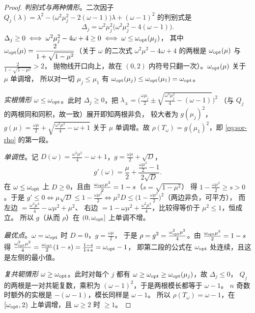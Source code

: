 \begin{proof}
\emph{判别式与两种情形}。二次因子
$Q_j(\lambda)=\lambda^2-\bigl(\omega^2\mu_j^2-2(\omega-1)\bigr)\lambda+(\omega-1)^2$ 的判别式是
\begin{equation}
  \Delta_j=\omega^2\mu_j^2\bigl(\omega^2\mu_j^2-4(\omega-1)\bigr).
\end{equation}
$\Delta_j\ge0\iff\omega^2\mu_j^2-4\omega+4\ge0\iff\omega\le\omega_{\rm opt}(\mu_j)$，
其中 $\omega_{\rm opt}(\mu)=\dfrac{2}{1+\sqrt{1-\mu^2}}$（关于 $\omega$ 的二次式
$\omega^2\mu^2-4\omega+4$ 的两根是 $\omega_{\rm opt}(\mu)$ 与 $\frac{2}{1-\sqrt{1-\mu^2}}>2$，
抛物线开口向上，故在 $(0,2)$ 内符号只翻一次）。$\omega_{\rm opt}(\mu)$ 关于 $\mu$ 单调增，
所以对一切 $\mu_j\le\mu_1$ 有 $\omega_{\rm opt}(\mu_j)\le\omega_{\rm opt}(\mu_1)=\omega_{\rm opt}$。

\emph{实根情形 $\omega\le\omega_{\rm opt}$}。此时 $\Delta_j\ge0$，把
$\lambda_\pm=\bigl(\frac{\omega\mu_j}{2}\pm\sqrt{\frac{\omega^2\mu_j^2}{4}-(\omega-1)}\bigr)^2$
（与 $Q_j$ 的两根同和同积，故一致）展开即知两根非负，
较大者为 $g(\mu_j)^2$，$g(\mu)=\frac{\omega\mu}{2}+\sqrt{\frac{\omega^2\mu^2}{4}-\omega+1}$
关于 $\mu$ 单调增。故 $\rho(T_\omega)=g(\mu_1)^2$，即 \eqref{eq:sor-rho} 的第一段。

\emph{单调性}。记 $D(\omega)=\frac{\omega^2\mu^2}{4}-\omega+1$，$g=\frac{\omega\mu}{2}+\sqrt D$，
\begin{equation}
  g'(\omega)=\frac{\mu}{2}+\frac{\frac{\omega\mu^2}{2}-1}{2\sqrt D}.
\end{equation}
在 $\omega\le\omega_{\rm opt}$ 上 $D\ge0$，且由 $\frac{\omega_{\rm opt}\mu^2}{2}=1-s$（$s=\sqrt{1-\mu^2}$）
得 $1-\frac{\omega\mu^2}{2}\ge s>0$。于是
$g'\le0\iff\mu\sqrt D\le1-\frac{\omega\mu^2}{2}
\iff\mu^2D\le\bigl(1-\frac{\omega\mu^2}{2}\bigr)^2$（两边非负，可平方），
而左边 $=\frac{\omega^2\mu^4}{4}-\omega\mu^2+\mu^2$、
右边 $=1-\omega\mu^2+\frac{\omega^2\mu^4}{4}$，比较得等价于 $\mu^2\le1$，恒成立。
所以 $g$（从而 $\rho$）在 $(0,\omega_{\rm opt}]$ 上单调不增。

\emph{最优点}。$\omega=\omega_{\rm opt}$ 时 $D=0$，$g=\frac{\omega\mu}{2}$，
于是 $\rho=g^2=\frac{\omega_{\rm opt}^2\mu^2}{4}$。由 $\frac{\omega_{\rm opt}\mu^2}{2}=1-s$ 得
$\frac{\omega_{\rm opt}^2\mu^2}{4}=\frac{\omega_{\rm opt}}{2}(1-s)=\frac{1-s}{1+s}=\omega_{\rm opt}-1$，
即第二段的公式在 $\omega_{\rm opt}$ 处连续，且这是左侧的最小值。

\emph{复共轭情形 $\omega\ge\omega_{\rm opt}$}。此时对每个 $j$ 都有
$\omega\ge\omega_{\rm opt}\ge\omega_{\rm opt}(\mu_j)$，故 $\Delta_j\le0$，
$Q_j$ 的两根是一对共轭复数，乘积为 $(\omega-1)^2$，于是两根模长都等于 $\omega-1$。
$n$ 奇数时额外的实根是 $-(\omega-1)$，模长同样是 $\omega-1$。
所以 $\rho(T_\omega)=\omega-1$，在 $[\omega_{\rm opt},2)$ 上单调增，且 $\omega\ge2$ 时 $\ge1$。


\end{proof}
